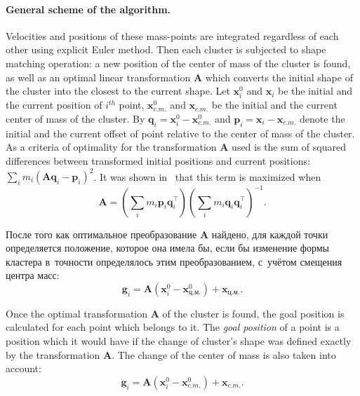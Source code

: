 \documentclass[a4paper, 12pt, titlepage]{extarticle}
\newcommand{\vect}[1]{\mathbf{#1}} %
\newcommand{\matx}[1]{\mathbf{#1}} %
\newcommand{\transposed}{\top} %
\begin{document}
        \paragraph{General scheme of the algorithm.} Velocities and positions of these mass-points
        are integrated regardless of each other using explicit Euler method. Then each cluster is
        subjected to shape matching operation: a new position of the center of mass of the cluster
        is found, as well as an optimal linear transformation $\matx A$ which converts the initial
        shape of the cluster into the closest to the current shape. Let $\vect{x}^0_i$ and
        $\vect{x}_i$ be the initial and the current position of $i^{th}$ point, $\vect{x}^0_{c.m.}$
        and $\vect{x}_{c.m.}$ be the initial and the current center of mass of the cluster. By
        $\vect{q}_i = \vect{x}^0_i - \vect{x}^0_{c.m.}$ and $\vect{p}_i = \vect{x}_i -
        \vect{x}_{c.m.}$ denote the initial and the current offset of point relative to the center
        of mass of the cluster. As a criteria of optimality for the transformation $\matx A$ used is
        the sum of squared differences between transformed initial positions and current positions:
        $\sum_i m_i (\matx A \vect{q}_i - \vect{p}_i )^2$. It was shown in~\cite{mueller-meshless}
        that this term is maximized when
        \begin{equation}
          \matx A = \left( \sum_i m_i \vect{p}_i \vect{q}_i^\transposed \right)
                    \left( \sum_i m_i \vect{q}_i \vect{q}_i^\transposed \right)^{-1}.
        \end{equation}

\begin{original}
        После того как оптимальное преобразование $\matx A$ найдено, для каждой точки определяется
        положение, которое она имела бы, если бы изменение формы кластера в~точности определялось этим
        преобразованием, с~учётом смещения центра масс:
        \begin{equation}
          \vect{g}_i = \matx{A} (\vect{x}^0_i - \vect{x}^0_{ц.м.}) + \vect{x}_{ц.м.}.
        \end{equation}
\end{original}

        Once the optimal transformation $\matx A$ of the cluster is found, the goal position is
        calculated for each point which belongs to it. The \emph{goal position} of a point is a
        position which it would have if the change of cluster's shape was defined exactly by the
        transformation $\matx A$. The change of the center of mass is also taken into account:
        \begin{equation}
          \vect{g}_i = \matx{A} (\vect{x}^0_i - \vect{x}^0_{c.m.}) + \vect{x}_{c.m.}.
        \end{equation}
\end{document}
